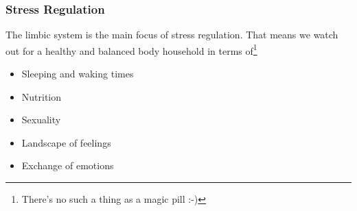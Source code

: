 \documentclass[../Book.Stress_regulation.tex]{subfiles}
\begin{document}
\subsubsection{Stress Regulation}


The limbic system is the {main focus of stress regulation}.
That means we watch out for a {healthy and balanced body household} in terms of\footnote{There's no such a thing as a magic pill :-) }
\begin{itemize}
\item Sleeping and waking times
\item Nutrition
\item Sexuality %
\item Landscape of feelings
\item Exchange of emotions
\end{itemize}
\end{document}
